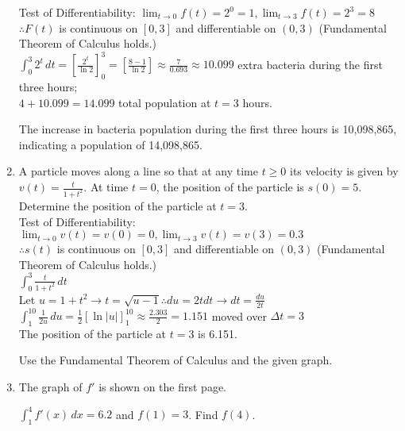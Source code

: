 \documentclass[10pt, letterpaper]{report}
\begin{document}
\begin{enumerate}
      Test of Differentiability:
      $\lim_{t\to 0}f(t)=2^{0}=1, \lim_{t\to 3}f(t)=2^{3}=8$ \\
      $\therefore F(t)$ is continuous on $[0,3]$ and differentiable on $(0,3)$ (Fundamental Theorem of Calculus holds.) \\

			$\int_{0}^{3}{2^t}\,dt=
      [\frac{2^{t}}{\ln{2}}]_{0}^{3}=
      [\frac{8-1}{\ln{2}}]\approx
      \frac{7}{0.693}\approx10.099$ extra bacteria during the first three hours; \\

      $4+10.099=14.099$ total population at $t=3$ hours.

      The increase in bacteria population during the first three hours is 10,098,865, indicating a population of 14,098,865. \\

		\item{A particle moves along a line so that at any time $t\geq 0$ its velocity is given by $v(t)=\frac{t}{1+t^{2}}$. At time $t=0$, the position of the particle is $s(0)=5$. Determine the position of the particle at $t=3$.} \\

      Test of Differentiability:
      $\lim_{t\to 0}v(t)=v(0)=0,
      \lim_{t\to 3}v(t)=v(3)=0.3$ \\
      $\therefore s(t)$ is continuous on $[0,3]$ and differentiable on $(0,3)$ (Fundamental Theorem of Calculus holds.) \\

			$\int_{0}^{3}{\frac{t}{1+t^{2}}}\,dt$ \\

      Let $u=1+t^2\rightarrow t=\sqrt{u-1}\therefore du=2tdt\rightarrow dt=\frac{du}{2t}$ \\

      $\int_{1}^{10}{\frac{1}{2u}}\,du=
      \frac{1}{2}[\ln{|u|}]_{1}^{10}\approx
      \frac{2.303}{2}=1.151$ moved over $\Delta t=3$\\

      The position of the particle at $t=3$ is 6.151. \\
\hline
    \par Use the Fundamental Theorem of Calculus and the given graph. \\
    \item{The graph of $f'$ is shown on the first page.

    $\int_{1}^{4}{f'(x)}\,dx=6.2$ and $f(1)=3$. Find $f(4)$.} \\


\end{enumerate}
\end{document}
